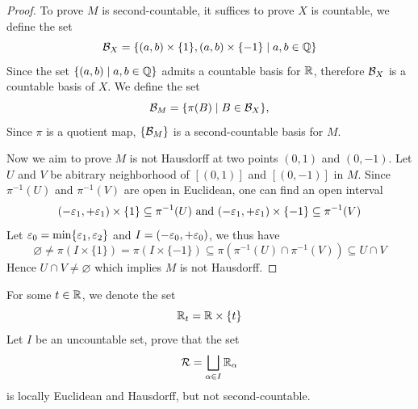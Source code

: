 \begin{proof}
    To prove $M$ is second-countable, it suffices to prove $X$ is countable, we define the set
    \[
        \mathcal{B}_X = \{(a,b)\times\{1\}, (a,b)\times\{-1\} \mid a,b \in \mathbb{Q}\}
    \]
    Since the set $\{(a,b)\mid a,b \in \mathbb{Q}\}$ admits a countable basis for $\mathbb{R}$, therefore $\mathcal{B}_X$ is a countable basis of $X$. We define the set 
    \[
        \mathcal{B}_M = \{\pi(B) \mid B \in \mathcal{B}_X\},
    \]
    Since $\pi$ is a quotient map, $\{\mathcal{B}_M\}$ is a second-countable basis for $M$.

    Now we aim to prove $M$ is not Hausdorff at two points $(0,1)$ and $(0,-1)$. Let $U $ and $V$ be abitrary neighborhood of $[(0,1)]$ and $[(0,-1)]$ in $M$. Since $\pi^{-1}(U)$ and $\pi^{-1}(V)$ are open in Euclidean, one can find an open interval 
    \begin{align*} 
        (-\varepsilon_1, +\varepsilon_1) \times \{1 \} \subseteq \pi^{-1}(U) \text{ and }(-\varepsilon_1, +\varepsilon_1) \times \{-1 \} \subseteq \pi^{-1}(V)
    \end{align*}
    Let $\varepsilon_0 = \min\{\varepsilon_1,\varepsilon_2\}$ and $I = (-\varepsilon_0,+\varepsilon_0)$, we thus have 
    \[
        \varnothing \neq \pi(I \times \{1\}) = \pi(I \times \{-1\}) \subseteq \pi(\pi^{-1}(U) \cap \pi^{-1} (V)) \subseteq U \cap V
    \]
    Hence $U \cap V \neq \varnothing$ which implies $M$ is not Hausdorff.
\end{proof}
\begin{problem}
    For some $t \in \mathbb{R}$, we denote the set 
    \[
        \mathbb{R}_t = \mathbb{R} \times \{t\}
    \]
    Let $I$ be an uncountable set, prove that the set 
    \[  
        \mathcal{R} = \bigsqcup_{\alpha \in I} \mathbb{R}_{\alpha}
    \]
    is locally Euclidean and Hausdorff, but not second-countable.
\end{problem}
